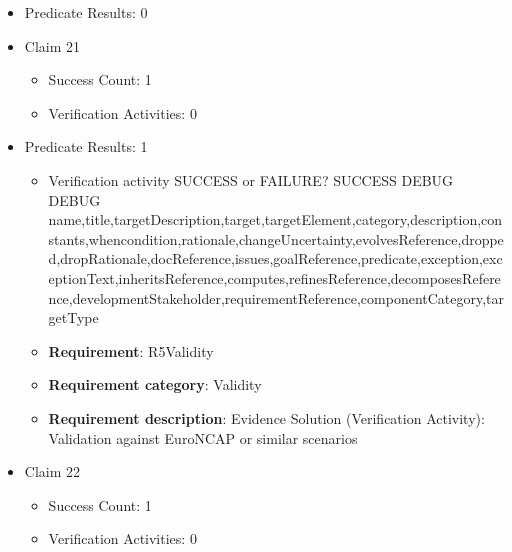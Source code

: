 \documentclass{article}
\begin{document}
\begin{itemize}
\begin{itemize}
					\item Verification activity SUCCESS or FAILURE? SUCCESS
					\item \textbf{Claim Weight}: 0
						\item \textbf{Requirement}: R4FeatureCalcTTC 
						\item \textbf{Requirement category}: FunctionsCoverage 
						\item \textbf{Requirement description}: Evidence Solution (Verification Activity): Check the features and subsystems covered by the model  To stop the vehicle if TTC is equal to MinTTC
					
				\end{itemize}
				
									    
				\item Predicate Results: 0

  				  \item Claim 21
				\begin{itemize}
			    	\item Success Count: 1 
			    	\item Verification Activities: 0
				\end{itemize}
				
									    
				\item Predicate Results: 1
					\begin{itemize}				
					\item Verification activity SUCCESS or FAILURE? SUCCESS
					DEBUG DEBUG name,title,targetDescription,target,targetElement,category,description,constants,whencondition,rationale,changeUncertainty,evolvesReference,dropped,dropRationale,docReference,issues,goalReference,predicate,exception,exceptionText,inheritsReference,computes,refinesReference,decomposesReference,developmentStakeholder,requirementReference,componentCategory,targetType
					\item \textbf{Requirement}: R5Validity 
					\item \textbf{Requirement category}: Validity
					\item \textbf{Requirement description}: Evidence Solution (Verification Activity): Validation against EuroNCAP or similar scenarios
					\end{itemize}

  				  \item Claim 22
				\begin{itemize}
			    	\item Success Count: 1 
			    	\item Verification Activities: 0
				\end{itemize}
				

\end{itemize}
\end{document}
